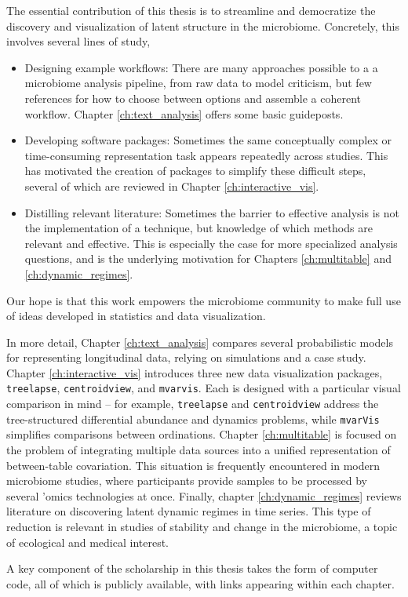 The essential contribution of this thesis is to streamline and democratize the
discovery and visualization of latent structure in the microbiome. Concretely,
this involves several lines of study,
\begin{itemize}
  \item Designing example workflows: There are many approaches possible to a a
    microbiome analysis pipeline, from raw data to model criticism, but few
    references for how to choose between options and assemble a coherent
    workflow. Chapter \ref{ch:text_analysis} offers some basic guideposts.
  \item Developing software packages: Sometimes the same conceptually complex or
    time-consuming representation task appears repeatedly across studies. This
    has motivated the creation of packages to simplify these difficult steps,
    several of which are reviewed in Chapter \ref{ch:interactive_vis}.
  \item Distilling relevant literature: Sometimes the barrier to effective
    analysis is not the implementation of a technique, but knowledge of which
    methods are relevant and effective. This is especially the case for more
    specialized analysis questions, and is the underlying motivation for
    Chapters \ref{ch:multitable} and \ref{ch:dynamic_regimes}.
\end{itemize}
Our hope is that this work empowers the microbiome community to make full use of
ideas developed in statistics and data visualization.

In more detail, Chapter \ref{ch:text_analysis} compares several probabilistic
models for representing longitudinal data, relying on simulations and a case
study. Chapter \ref{ch:interactive_vis} introduces three new data visualization
packages, \texttt{treelapse}, \texttt{centroidview}, and \texttt{mvarvis}. Each
is designed with a particular visual comparison in mind -- for example,
\texttt{treelapse} and \texttt{centroidview} address the tree-structured
differential abundance and dynamics problems, while \texttt{mvarVis} simplifies
comparisons between ordinations. Chapter \ref{ch:multitable} is focused on the
problem of integrating multiple data sources into a unified representation of
between-table covariation. This situation is frequently encountered in modern
microbiome studies, where participants provide samples to be processed by
several 'omics technologies at once. Finally, chapter \ref{ch:dynamic_regimes}
reviews literature on discovering latent dynamic regimes in time series. This
type of reduction is relevant in studies of stability and change in the
microbiome, a topic of ecological and medical interest.

A key component of the scholarship in this thesis takes the form of computer
code, all of which is publicly available, with links appearing within each
chapter.

